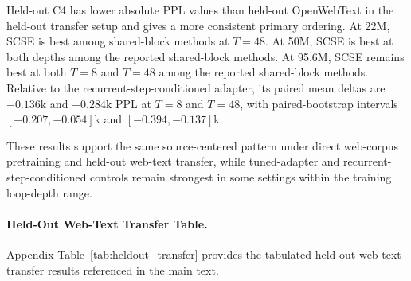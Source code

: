 \documentclass[letterpaper]{article} %
\newcommand{\SCSE}{\textsc{SCSE}}
\theoremstyle{remark}
\begin{document}
Held-out C4 has lower absolute PPL values than held-out OpenWebText in the held-out transfer setup and gives a more consistent primary ordering.  At 22M, \SCSE{} is best among shared-block methods at $T=48$.  At 50M, \SCSE{} is best at both depths among the reported shared-block methods.  At 95.6M, \SCSE{} remains best at both $T=8$ and $T=48$ among the reported shared-block methods.  Relative to the recurrent-step-conditioned adapter, its paired mean deltas are $-0.136$k and $-0.284$k PPL at $T=8$ and $T=48$, with paired-bootstrap intervals $[-0.207,-0.054]$k and $[-0.394,-0.137]$k.

These results support the same source-centered pattern under direct web-corpus pretraining and held-out web-text transfer, while tuned-adapter and recurrent-step-conditioned controls remain strongest in some settings within the training loop-depth range.

\paragraph{Held-Out Web-Text Transfer Table.} Appendix Table~\ref{tab:heldout_transfer} provides the tabulated held-out web-text transfer results referenced in the main text.
\end{document}
